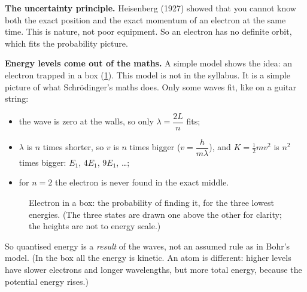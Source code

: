 \textbf{The uncertainty principle.} Heisenberg (1927) showed that you cannot know both the
exact position and the exact momentum of an electron at the same time. This is nature, not
poor equipment. So an electron has no definite orbit, which fits the probability picture.

\textbf{Energy levels come out of the maths.} A simple model shows the idea: an electron
trapped in a box (\cref{ch3:fig:box}). This model is not in the syllabus. It is a simple
picture of what Schrödinger's maths does. Only some waves fit, like on a guitar string:
\begin{itemize}
  \item the wave is zero at the walls, so only $\lambda = \dfrac{2L}{n}$ fits;
  \item $\lambda$ is $n$ times shorter, so $v$ is $n$ times bigger ($v = \dfrac{h}{m\lambda}$),
        and $K = \frac12 mv^2$ is $n^2$ times bigger: $E_1$, $4E_1$, $9E_1$, \ldots;
  \item for $n = 2$ the electron is never found in the exact middle.
\end{itemize}

\begin{figure}
  \centering
  \caption{Electron in a box: the probability of finding it, for the three lowest energies.
    (The three states are drawn one above the other for clarity; the heights are not to
    energy scale.)}
  \label{ch3:fig:box}
\end{figure}

So quantised energy is a \emph{result} of the waves, not an assumed rule as in Bohr's model.
(In the box all the energy is kinetic. An atom is different: higher levels have slower
electrons and longer wavelengths, but more total energy, because the potential energy rises.)

